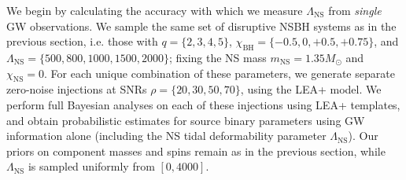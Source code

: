 \documentclass[aps,prd,amsmath,floats,floatfix, twocolumn,
superscriptaddress,nofootinbib,showpacs]{revtex4-1}
\newcommand{\lambdans}{\Lambda_\mathrm{NS}}
\newcommand{\chibh}{\chi_\mathrm{BH}}
\newcommand{\chins}{\chi_\mathrm{NS}}
\newcommand{\mns}{m_\mathrm{NS}}
\begin{document}
%
% 
% 
We begin by calculating the accuracy with which we measure
$\lambdans$ from {\it single} GW observations. We sample the same set of
disruptive NSBH systems as in the previous section, i.e. those with
$q=\{2,3,4,5\}$, $\chibh=\{-0.5,0,+0.5,+0.75\}$, and $\lambdans=\{500, 800, 1000, 1500, 2000\}$;
fixing the NS mass $\mns=1.35 M_\odot$ and $\chins=0$.
For each unique combination of these parameters, we generate separate 
zero-noise injections at SNRs $\rho=\{20,30,50,70\}$, using the LEA+ model. We
perform full Bayesian analyses on each of these injections using LEA+ templates,
and obtain probabilistic estimates for source binary parameters using GW information
alone (including the NS tidal deformability parameter $\lambdans$). Our priors
on component masses and spins remain as in the previous section, while $\lambdans$
is sampled uniformly from $[0,4000]$.
\end{document}
